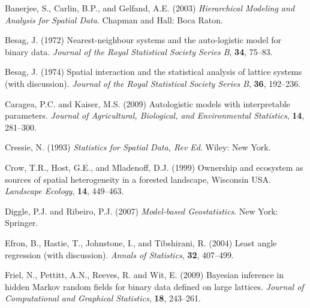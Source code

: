 \documentclass[authoryear,review, 12pt]{elsarticle}
\begin{document}
\begin{thebibliography}{00}

 Banerjee, S., Carlin, B.P., and Gelfand, A.E. (2003)  \textit{Hierarchical Modeling and Analysis for Spatial Data}. Chapman and Hall: Boca Raton.

 Besag, J. (1972) Nearest-neighbour systems and the auto-logistic model for binary data. \textit{Journal of the Royal Statistical Society Series B}, \textbf{34}, 75--83.

 Besag, J. (1974) Spatial interaction and the statistical analysis of lattice systems (with discussion). \textit{Journal of the Royal Statistical Society Series B}, \textbf{36}, 192--236.

 Caragea, P.C. and Kaiser, M.S. (2009) Autologistic models with interpretable parameters. \textit{Journal of Agricultural, Biological, and Environmental Statistics}, \textbf{14}, 281--300.

 Cressie, N. (1993)  \textit{Statistics for Spatial Data, Rev Ed}. Wiley: New York.

 Crow, T.R., Host, G.E., and Mladenoff, D.J. (1999)  Ownership and ecosystem as sources of spatial heterogeneity in a forested landscape, Wisconsin USA.  \textit{Landscape Ecology}, \textbf{14}, 449--463. 

 Diggle, P.J. and Ribeiro, P.J. (2007) \textit{Model-based Geostatistics}. New York: Springer.

 Efron, B., Hastie, T., Johnstone, I., and Tibshirani, R. (2004) Least angle regression (with discussion). \textit{Annals of Statistics}, \textbf{32}, 407--499.



 Friel, N., Pettitt, A.N., Reeves, R. and Wit, E. (2009) Bayesian inference in hidden {M}arkov random fields for binary data defined on large lattices. \textit{Journal of Computational and Graphical Statistics}, \textbf{18}, 243--261.


\end{thebibliography}
\end{document}
